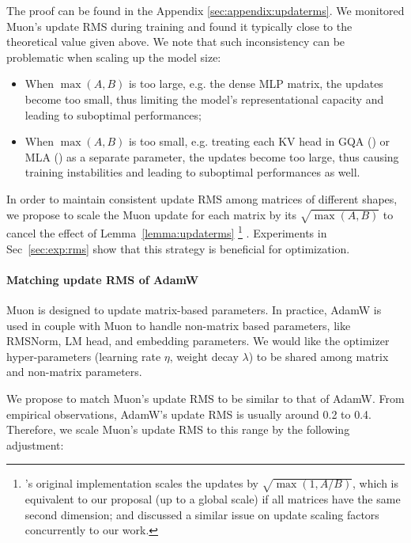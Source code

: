 The proof can be found in the Appendix \ref{sec:appendix:updaterms}. We monitored Muon's update RMS during training and found it typically close to the theoretical value given above. We note that such inconsistency can be problematic when scaling up the model size:

\begin{itemize}
    \item When $\max(A,B)$ is too large, e.g. the dense MLP matrix, the updates become too small, thus limiting the model's representational capacity and leading to suboptimal performances; 
    
    \item When $\max(A,B)$ is too small, e.g. treating each KV head in GQA (\cite{shazeer2019fasttransformerdecodingwritehead}) or MLA (\cite{deepseekai2024deepseekv3technicalreport}) as a separate parameter, the updates become too large, thus causing training instabilities and leading to suboptimal performances as well.
\end{itemize}

In order to maintain consistent update RMS among matrices of different shapes, we 
propose to scale the Muon update for each matrix by its $\sqrt{\max(A, B)}$ to cancel the effect of Lemma~\ref{lemma:updaterms} \footnote{\cite{jordan2024muon}'s original implementation scales the updates by $\sqrt{\max(1, A/B)}$, which is equivalent to our proposal (up to a global scale) if all matrices have the same second dimension; \cite{pethick2025trainingdeeplearningmodels} and \cite{JiachengX} discussed a similar issue on update scaling factors concurrently to our work. } . 
Experiments in Sec~\ref{sec:exp:rms} show that this strategy is beneficial for optimization.

\paragraph{Matching update RMS of AdamW}

Muon is designed to update matrix-based parameters. In practice, AdamW is used in couple with Muon to handle non-matrix based parameters, like RMSNorm, LM head, and embedding parameters. 
We would like the optimizer hyper-parameters (learning rate $\eta$, weight decay $\lambda$) to be shared among
matrix and non-matrix parameters. 

We propose to match Muon's update RMS to be similar to that of AdamW. From empirical observations, AdamW's update RMS is usually around 0.2 to 0.4. Therefore, we scale Muon's update RMS to this range by the following adjustment:

